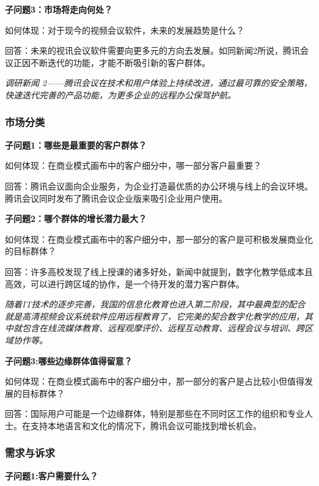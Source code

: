 \documentclass[a4paper,12pt]{article}
\begin{document}
    
    \textbf{子问题3：市场将走向何处？}

    如何体现：对于现今的视频会议软件，未来的发展趋势是什么？

    回答：未来的视讯会议软件需要向更多元的⽅向去发展。如同新闻2所说，腾讯会议正因不断迭代的功能，才能不断吸引新的客户群体。

    \textit{调研新闻 2——腾讯会议在技术和⽤户体验上持续改进，通过最可靠的安全策略，快速迭代完善的产品功能，为更多企业的远程办公保驾护航。}

    
    \subsubsection{市场分类}
    \textbf{子问题1：哪些是最重要的客户群体？}

    如何体现：在商业模式画布中的客户细分中，哪⼀部分客户最重要？

    回答：腾讯会议⾯向企业服务，为企业打造最优质的办公环境与线上的会议环境。腾讯会议同时发布了腾讯会议企业版来吸引企业用户使用。
    
    \textbf{子问题2：哪个群体的增长潜力最大？}

    如何体现：在商业模式画布中的客户细分中，那⼀部分的客户是可积极发展商业化的⽬标群体？

    回答：许多⾼校发现了线上授课的诸多好处，新闻中就提到，数字化教学低成本且⾼效，可以进⾏跨区域的协作，是⼀个待开发的潜⼒客户群体。

    \textit{随着IT技术的逐步完善，我国的信息化教育也进⼊第⼆阶段，其中最典型的配合就是⾼清视频会议系统软件应⽤远程教育了，它完美的契合数字化教学的应⽤，其中就包含在线流媒体教育、远程观摩评价、远程互动教育、远程会议与培训、跨区域协作等。}


    \textbf{子问题3:哪些边缘群体值得留意？}

    如何体现：在商业模式画布中的客户细分中，那⼀部分的客户是占比较小但值得发展的⽬标群体？

    回答：国际用户可能是一个边缘群体，特别是那些在不同时区工作的组织和专业人士。在支持本地语言和文化的情况下，腾讯会议可能找到增长机会。
    
    \subsubsection{需求与诉求}
    \textbf{子问题1:客户需要什么？}
\end{document}

